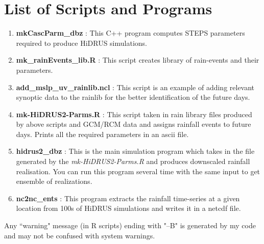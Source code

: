 \documentclass[12pt, a4paper]{extarticle}
\begin{document}
\section{List of Scripts and Programs}
\begin{enumerate}
\item \textbf{mkCascParm\_dbz} : This C++ program computes STEPS parameters required to produce HiDRUS simulations.
\item \textbf{mk\_rainEvents\_lib.R} : This script creates library of rain-events and their parameters.

\item \textbf{add\_mslp\_uv\_rainlib.ncl} : This script is an example of adding relevant synoptic data to the rainlib for the better identification of the future days.
\item \textbf{mk-HiDRUS2-Parms.R} : This script taken in rain library files produced by above scripts and GCM/RCM data and assigns rainfall events to future days. Prints all the required parameters in an ascii file.
\item \textbf{hidrus2\_dbz} : This is the main simulation program which takes in the file generated by the \emph{mk-HiDRUS2-Parms.R} and produces downscaled rainfall realisation. You can run this program several time with the same input to get ensemble of realizations.
\item \textbf{nc2nc\_ents} : This program extracts the rainfall time-series at a given location from 100s of HiDRUS simulations and writes it in a netcdf file.

\end{enumerate}
Any ``warning" message (in R scripts) ending with "--B" is generated by my code and may not be confused with system warnings.
\end{document}
